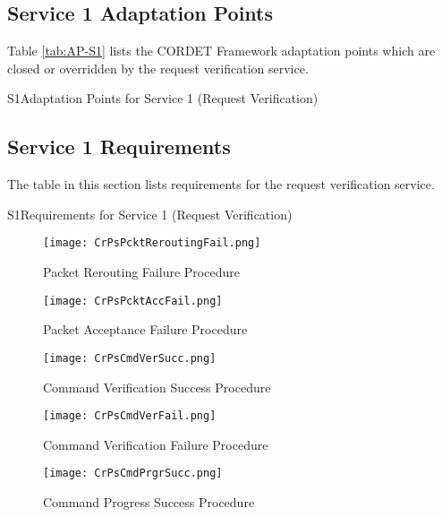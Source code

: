 \documentclass{pnp_article}
\begin{document}
\subsection{Service 1 Adaptation Points}\label{sec:serv1AP}
Table \ref{tab:AP-S1} lists the CORDET Framework adaptation points which are closed or overridden by the request verification service. 

\begin{crAp}{S1}{Adaptation Points for Service 1 (Request Verification)}
\end{crAp}


\subsection{Service 1 Requirements}
The table in this section lists requirements for the request verification service.

\begin{crReq}{S1}{Requirements for Service 1 (Request Verification)}
\end{crReq}


\newpage
\begin{figure}[H]
 \centering
 \texttt{[image: CrPsPcktReroutingFail.png]}
 \caption{Packet Rerouting Failure Procedure}
 \label{fig:PcktReroutingFail}
\end{figure}

\begin{figure}[htbp]
 \centering
 \texttt{[image: CrPsPcktAccFail.png]}
 \caption{Packet Acceptance Failure Procedure}
 \label{fig:PcktAccFail}
\end{figure}

\begin{figure}[htbp]
 \centering
 \texttt{[image: CrPsCmdVerSucc.png]}
 \caption{Command Verification Success Procedure}
 \label{fig:CmdVerSucc}
\end{figure}

\begin{figure}[htbp]
 \centering
 \texttt{[image: CrPsCmdVerFail.png]}
 \caption{Command Verification Failure Procedure}
 \label{fig:CmdVerFail}
\end{figure}

\begin{figure}[htbp]
 \centering
 \texttt{[image: CrPsCmdPrgrSucc.png]}
 \caption{Command Progress Success Procedure}
 \label{fig:CmdPrgrSucc}
\end{figure}
\end{document}
